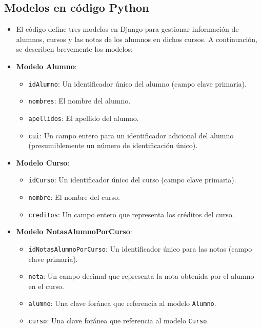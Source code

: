 \documentclass{article}
\begin{document}
  
\subsection{Modelos en código Python}
\begin{itemize}
    \item El código define tres modelos en Django para gestionar información de alumnos, cursos y las notas de los alumnos en dichos cursos. A continuación, se describen brevemente los modelos:
\end{itemize}

\begin{itemize}
    \item \textbf{Modelo Alumno}:
    \begin{itemize}
        \item \texttt{idAlumno}: Un identificador único del alumno (campo clave primaria).
        \item \texttt{nombres}: El nombre del alumno.
        \item \texttt{apellidos}: El apellido del alumno.
        \item \texttt{cui}: Un campo entero para un identificador adicional del alumno (presumiblemente un número de identificación único).
    \end{itemize}

    \item \textbf{Modelo Curso}:
    \begin{itemize}
        \item \texttt{idCurso}: Un identificador único del curso (campo clave primaria).
        \item \texttt{nombre}: El nombre del curso.
        \item \texttt{creditos}: Un campo entero que representa los créditos del curso.
    \end{itemize}

    \item \textbf{Modelo NotasAlumnoPorCurso}:
    \begin{itemize}
        \item \texttt{idNotasAlumnoPorCurso}: Un identificador único para las notas (campo clave primaria).
        \item \texttt{nota}: Un campo decimal que representa la nota obtenida por el alumno en el curso.
        \item \texttt{alumno}: Una clave foránea que referencia al modelo \texttt{Alumno}.
        \item \texttt{curso}: Una clave foránea que referencia al modelo \texttt{Curso}.
    \end{itemize}
\end{itemize}
\end{document}
